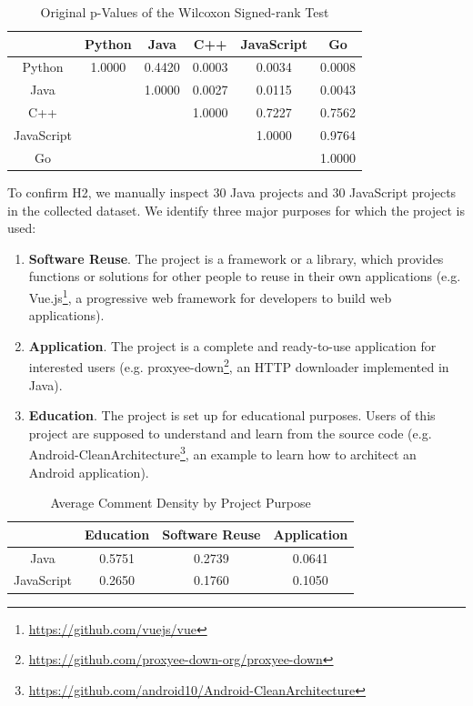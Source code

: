 \documentclass[sigconf,screen]{acmart}
\begin{document}
\begin{table}
  \caption{Original p-Values of the Wilcoxon Signed-rank Test}
  \label{tab:pvalue}
  \begin{tabular}{cccccc}
    \toprule
    &Python&Java&C++&JavaScript&Go\\
    \midrule
    Python&1.0000&0.4420&0.0003&0.0034&0.0008\\
    Java&&1.0000&0.0027&0.0115&0.0043\\
    C++&&&1.0000&0.7227&0.7562\\
    JavaScript &&&&1.0000&0.9764\\
    Go &&&&&1.0000\\
  \bottomrule
\end{tabular}
\end{table}

To confirm H2, we manually inspect 30 Java projects and 30 JavaScript projects in the collected dataset. We identify three major purposes for which the project is used:
\begin{enumerate}
    \item \textbf{Software Reuse}. The project is a framework or a library, which provides functions or solutions for other people to reuse in their own applications (e.g. Vue.js\footnote{\url{https://github.com/vuejs/vue}}, a progressive web framework for developers to build web applications).
    \item \textbf{Application}. The project is a complete and ready-to-use application for interested users (e.g. proxyee-down\footnote{\url{https://github.com/proxyee-down-org/proxyee-down}}, an HTTP downloader implemented in Java).
    \item \textbf{Education}. The project is set up for educational purposes. Users of this project are supposed to understand and learn from the source code (e.g. Android-CleanArchitecture\footnote{\url{https://github.com/android10/Android-CleanArchitecture}}, an example to learn how to architect an Android application).
\end{enumerate}

\begin{table}
  \caption{Average Comment Density by Project Purpose}
  \label{tab:cd_type}
  \begin{tabular}{cccc}
    \toprule
    &Education&Software Reuse&Application\\
    \midrule
    Java&0.5751&0.2739&0.0641\\
    JavaScript&0.2650&0.1760&0.1050\\
  \bottomrule
\end{tabular}
\end{table}
\end{document}
